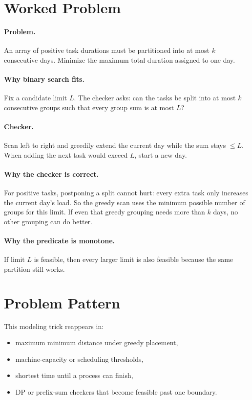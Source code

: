 \section*{Worked Problem}

\paragraph{Problem.}
An array of positive task durations must be partitioned into at most \(k\) consecutive days. Minimize the maximum total
duration assigned to one day.

\paragraph{Why binary search fits.}
Fix a candidate limit \(L\). The checker asks: can the tasks be split into at most \(k\) consecutive groups such that
every group sum is at most \(L\)?

\paragraph{Checker.}
Scan left to right and greedily extend the current day while the sum stays \(\le L\). When adding the next task would
exceed \(L\), start a new day.

\paragraph{Why the checker is correct.}
For positive tasks, postponing a split cannot hurt: every extra task only increases the current day's load. So the
greedy scan uses the minimum possible number of groups for this limit. If even that greedy grouping needs more than
\(k\) days, no other grouping can do better.

\paragraph{Why the predicate is monotone.}
If limit \(L\) is feasible, then every larger limit is also feasible because the same partition still works.

\section*{Problem Pattern}

This modeling trick reappears in:

\begin{itemize}
  \item maximum minimum distance under greedy placement,
  \item machine-capacity or scheduling thresholds,
  \item shortest time until a process can finish,
  \item DP or prefix-sum checkers that become feasible past one boundary.
\end{itemize}

